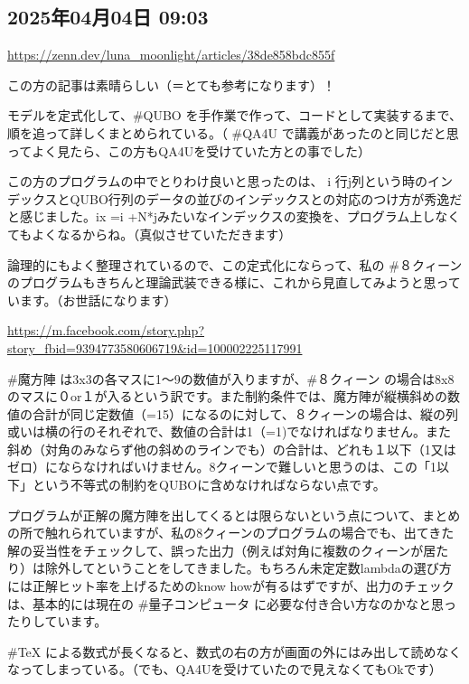 \documentclass[facebook_diary.tex]{subfiles}
\begin{document}
\subsection*{2025年04月04日 09:03}

\url{https://zenn.dev/luna_moonlight/articles/38de858bdc855f}




この方の記事は素晴らしい（＝とても参考になります）！

モデルを定式化して、\#QUBO を手作業で作って、コードとして実装するまで、順を追って詳しくまとめられている。（ \#QA4U で講義があったのと同じだと思ってよく見たら、この方もQA4Uを受けていた方との事でした）


この方のプログラムの中でとりわけ良いと思ったのは、 i 行j列という時のインデックスとQUBO行列のデータの並びのインデックスとの対応のつけ方が秀逸だと感じました。ix =i +N*jみたいなインデックスの変換を、プログラム上しなくてもよくなるからね。（真似させていただきます）


論理的にもよく整理されているので、この定式化にならって、私の \#８クィーン のプログラムもきちんと理論武装できる様に、これから見直してみようと思っています。（お世話になります）


\url{https://m.facebook.com/story.php?story_fbid=9394773580606719&id=100002225117991}




\#魔方陣 は3x3の各マスに1〜9の数値が入りますが、\#８クィーン の場合は8x8のマスに０or１が入るという訳です。また制約条件では、魔方陣が縦横斜めの数値の合計が同じ定数値（=15）になるのに対して、８クィーンの場合は、縦の列或いは横の行のそれぞれで、数値の合計は1（=1)でなければなりません。また斜め（対角のみならず他の斜めのラインでも）の合計は、どれも１以下（1又はゼロ）にならなければいけません。8クィーンで難しいと思うのは、この「1以下」という不等式の制約をQUBOに含めなければならない点です。


プログラムが正解の魔方陣を出してくるとは限らないという点について、まとめの所で触れられていますが、私の8クィーンのプログラムの場合でも、出てきた解の妥当性をチェックして、誤った出力（例えば対角に複数のクィーンが居たり）は除外してということをしてきました。もちろん未定定数lambdaの選び方には正解ヒット率を上げるためのknow howが有るはずですが、出力のチェックは、基本的には現在の \#量子コンピュータ に必要な付き合い方なのかなと思ったりしています。


\#TeX による数式が長くなると、数式の右の方が画面の外にはみ出して読めなくなってしまっている。（でも、QA4Uを受けていたので見えなくてもOkです）
\end{document}
